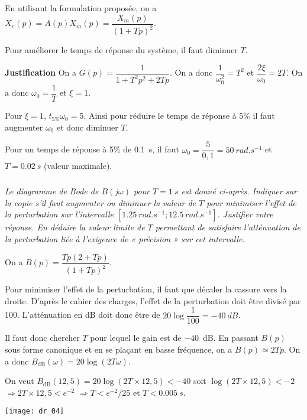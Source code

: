 \begin{multicols}{2}
\begin{corrige}
En utilisant la formulation proposée, on a $X_v(p) = A(p)X_m(p)  =\dfrac{X_m(p) }{\left(1+Tp\right)^2} $.

Pour améliorer le temps de réponse du système, il faut diminuer $T$. 

\textbf{Justification}
On a $G(p)=\dfrac{1}{1+T^2p^2 +2Tp}$. On a donc $\dfrac{1}{\omega_0^2}=T^2$ et $\dfrac{2\xi}{\omega_0}=2T$. On a donc $\omega_0=\dfrac{1}{T}$ et $\xi = 1$.

Pour $\xi=1$, $t_{5\%}\omega_0 = 5$. Ainsi pour réduire le temps de réponse à 5\% il faut augmenter $\omega_0$ et donc diminuer $T$.

Pour un temps de réponse à 5\% de \SI{0,1}{s}, il faut $\omega_0 = \dfrac{5}{0,1}=\SI{50}{rad.s^{-1}}$ et $T=\SI{0,02}{s}$ (valeur maximale).

\end{corrige}
\else
\fi

\subparagraph{}\textit{Le diagramme de Bode de $B(j\omega)$ pour $T = \SI{1}{s}$ est donné ci-après. Indiquer sur la copie s’il faut augmenter ou diminuer la valeur de $T$ pour minimiser l’effet de
la perturbation sur l’intervalle $[\SI{1,25}{rad.s^{-1}};\SI{12,5}{rad.s^{-1}}]$. Justifier votre réponse. En déduire
la valeur limite de $T$ permettant de satisfaire l’atténuation de la perturbation liée à l’exigence
de « précision » sur cet intervalle.}
\ifprof
\begin{corrige} 
On a  $B(p)=\dfrac{Tp\left(2+Tp \right)}{\left(1+Tp\right)^2}$.

Pour minimiser l'effet de la perturbation, il faut que décaler la cassure vers la droite. D'après le cahier des charges, l'effet de la perturbation doit être divisé par 100. L'atténuation en dB doit donc être de $20\log \dfrac{1}{100} = -\SI{40}{dB}$. 

Il faut donc chercher $T$ pour lequel le gain est de \SI{-40}{dB}. En passant $B(p)$ sous forme canonique et en se plaçant en basse fréquence, on a $B(p)\simeq 2Tp$. On a donc $B_{\text{dB}}(\omega)=20\log \left(2T\omega \right)$. 

On veut $B_{\text{dB}}(12,5)=20\log \left(2T\times 12,5\right) < -40$
soit $\log \left(2T\times 12,5\right) < -2$ $\Rightarrow  2T\times 12,5< e^{-2}$
$\Rightarrow  T< e^{-2}/25$ et $T<\SI{0,005}{s}$. 

\end{corrige}
\else
\fi

\begin{center}
\texttt{[image: dr\_04]}
\end{center}

\end{multicols}

\begin{center}
\end{center}
%
%
%
%